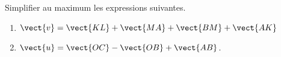 
\begin{exercice}\label{exosmath-0067}

Simplifier au maximum les expressions suivantes.
\begin{enumerate}
    \item
        \( \vect{ v }=\vect{ KL }+\vect{ MA }+\vect{ BM }+\vect{ AK }\)
    \item
        \( \vect{ u }=\vect{ OC }-\vect{ OB }+\vect{ AB }\).
\end{enumerate}

\end{exercice}
